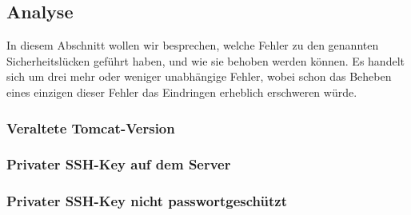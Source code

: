 \subsection{Analyse}
In diesem Abschnitt wollen wir besprechen, welche Fehler zu den genannten Sicherheitslücken geführt haben, und wie sie behoben werden können. Es handelt sich um drei mehr oder weniger unabhängige Fehler, wobei schon das Beheben eines einzigen dieser Fehler das Eindringen erheblich erschweren würde.

\subsubsection{Veraltete Tomcat-Version}

\subsubsection{Privater SSH-Key auf dem Server}

\subsubsection{Privater SSH-Key nicht passwortgeschützt}

